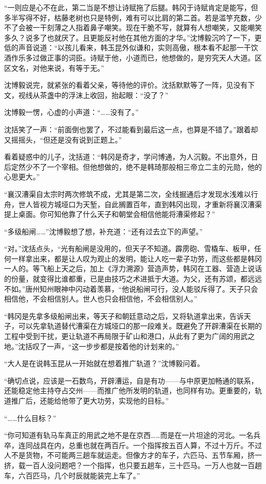“一则应是心不在此，第二当是不想让诗赋拖了后腿。韩冈于诗赋肯定是能写，但多半写得不好，枯藤老树也只是特例，难有可以比肩的第二首。若是滥竽充数，少不了会被一干刻薄之人指着鼻子嘲笑。现在干脆不写，就算有人想嘲笑，又能嘲笑多久？说多了也就厌了。且更能反衬他在其他方面的才华。”沈博毅沉吟了一下，更低的声音说道：“以孩儿看来，韩玉昆外似谦和，实则高傲，根本看不起那一干饮酒作乐多过做正事的词臣。诗赋于他，小道而已，他想做的，是穷究天人大道。区区文名，对他来说，有等于无。”

沈博毅说完，就紧张的看着父亲，等待他的评价。沈括默默等了一阵，见没有下文，视线从茶盏中的浮沫上收回，抬起眼：“没了？”

沈博毅一愣，心虚的小声道：“……没有了。”

沈括笑了一声：“前面倒也罢了，不过能看到最后这一点，也算是不错了。”跟着却又摇摇头，“但还是没有说到正题上。”

看着疑惑中的儿子，沈括道：“韩冈是奇才，学问博通，为人沉毅。不出意外，日后定然少不了一个宰相。但他想做的，绝不是韩琦那般相三帝立二主的元勋，他的心思更大。”

“襄汉漕渠自太宗时两次修筑不成，尤其是第二次，全线掘通后才发现水浅难以行舟，世人皆视方城垭口为天堑，自此搁置百年，直到韩冈出现，才重新将襄汉漕渠提上桌面。你可知他靠了什么天子和朝堂会相信他能将漕渠修起？”

“多级船闸……”沈博毅想了想，补充道：“还有过去立下的声望。”

“对。”沈括点头，“光有船闸是没用的，但天子不知道。霹雳砲、雪橇车、板甲，任何一样拿出来，都是让人叹为观止的发明，能让人吃一辈子功劳，而这些都是韩冈一人的。等飞船上天之后，加上《浮力溯源》营造声势，韩冈在工器、营造上说话的份量，就变得比谁都重，已是由技巧之术进抵于大道。为父，还有苏颂，都远远不如。”唐州知州眼神中闪动着羡慕，“他说船闸可行，没人能驳斥得了。天子只会相信他，不会相信别人。世人也只会相信他，不会相信别人。”

“韩冈是先拿多级船闸出来，等天子和朝廷意动之后，又将轨道拿出来，告诉天子，可以先拿轨道替代漕渠在方城垭口的那一段难关。既避免了开辟漕渠在长期的工程中受到干扰，更让轨道不再局限于矿山和港口，从此有了更为广阔的用武之地。”沈括叹了一声，“这一步步都是按着他的计划来的。”

“大人是在说韩玉昆从一开始就在想着推广轨道？”沈博毅问着。

“确切点说，应该是一石数鸟，开辟漕运，自是有功——与中原更加畅通的联系，还能稳定他主持夺占交州——而推广他所发明的轨道，也同样有功。更重要的，轨道推广后，还能给他带了更大功劳，实现他的目标。”

“……什么目标？”

“你可知道有轨马车真正的用武之地不是在京西……而是在一片坦途的河北。一名兵卒，连同战具在内，总重也就在两百斤。一个指挥按五百人算，不过十万斤。不过人不是货物，不可能两三趟车就运走。但像方才的车子，六匹马、五节车厢，挤一挤，载一百人没问题吧？一个指挥，也只要五趟车，三十匹马。一万人也就一百趟车，六百匹马，几个时辰就能装完上车了。”

